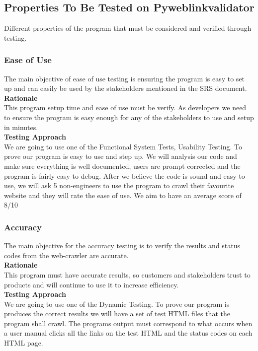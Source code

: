 \documentclass[12pt, titlepage]{article}
\begin{document}
\subsection{Properties To Be Tested on Pyweblinkvalidator}
Different properties of the program that must be considered and verified through testing.\\
\subsubsection{Ease of Use}
The main objective of ease of use testing is ensuring the program is easy to set up and can easily be used by the stakeholders mentioned in the SRS document.\\

\textbf{Rationale}  \\

This program setup time and ease of use must be verify. As developers we need to ensure the program is easy enough for any of the stakeholders to use and setup in minutes.\\

\textbf{Testing Approach} \\ 

 We are going to use one of the  Functional System Tests, Usability Testing. To prove our program is easy to use and step up. We will analysis our code and make sure everything is well documented, users are prompt corrected and the program is fairly easy to debug. After we believe the code is sound and easy to use, we will ask 5 non-engineers to use the program to crawl their favourite website and they will rate the ease of use. We aim to have an average score of 8/10

\subsubsection{Accuracy}
The main objective for the accuracy testing is to verify the results and status codes from the web-crawler are accurate.\\

\textbf{Rationale}  \\

This program must have accurate results, so customers and stakeholders trust to products and will continue to use it to increase efficiency.\\

\textbf{Testing Approach} \\ 

 We are going to use one of the  Dynamic Testing. To prove our program is produces the correct results we will have a set of test HTML files that the  program shall crawl. The programs output must correspond to what occurs when a user manual clicks all the links on the test HTML and the status codes on each HTML page.
\end{document}
